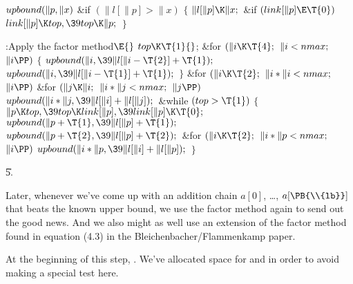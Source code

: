 \Y\B\4\D$\\{upbound}(\|p,\|x)$ \6
\&{if} ${}(\|l[\|p]>\|x){}$\5
${}\{{}$\1\6
${}\|l[\|p]\K\|x;{}$\6
\&{if} ${}(\\{link}[\|p]\E\T{0}){}$\1\5
${}\\{link}[\|p]\K\\{top},\39\\{top}\K\|p;{}$\2\6
\4${}\}{}$\2\par
\Y\B\4:Apply the factor method\X${}\E{}$\6
$\\{top}\K\T{1}{}$;\6
\&{for} ${}(\|i\K\T{4};{}$ ${}\|i<\\{nmax};{}$ ${}\|i\PP){}$\5
${}\{{}$\1\6
${}\\{upbound}(\|i,\39\|l[\|i-\T{2}]+\T{1});{}$\6
${}\\{upbound}(\|i,\39\|l[\|i-\T{1}]+\T{1});{}$\6
\4${}\}{}$\2\6
\&{for} ${}(\|i\K\T{2};{}$ ${}\|i*\|i<\\{nmax};{}$ ${}\|i\PP){}$\1\6
\&{for} ${}(\|j\K\|i;{}$ ${}\|i*\|j<\\{nmax};{}$ ${}\|j\PP){}$\1\5
${}\\{upbound}(\|i*\|j,\39\|l[\|i]+\|l[\|j]);{}$\2\2\6
\&{while} ${}(\\{top}>\T{1}){}$\5
${}\{{}$\1\6
${}\|p\K\\{top},\39\\{top}\K\\{link}[\|p],\39\\{link}[\|p]\K\T{0};{}$\6
${}\\{upbound}(\|p+\T{1},\39\|l[\|p]+\T{1});{}$\6
${}\\{upbound}(\|p+\T{2},\39\|l[\|p]+\T{2});{}$\6
\&{for} ${}(\|i\K\T{2};{}$ ${}\|i*\|p<\\{nmax};{}$ ${}\|i\PP){}$\1\5
${}\\{upbound}(\|i*\|p,\39\|l[\|i]+\|l[\|p]);{}$\2\6
\4${}\}{}$\2\par
\U5.\fi

Later, whenever we've come up with an addition chain
$a[0]$, \dots, $a[\PB{\\{lb}}]$ that beats the known upper bound,
we use the factor method again to send out the good news. And we also
might as well use an extension of the factor method found in
equation (4.3) in the Bleichenbacher/Flammenkamp paper.

At the beginning of this step, . We've allocated space for
 and  in order to avoid making a
special test here.

